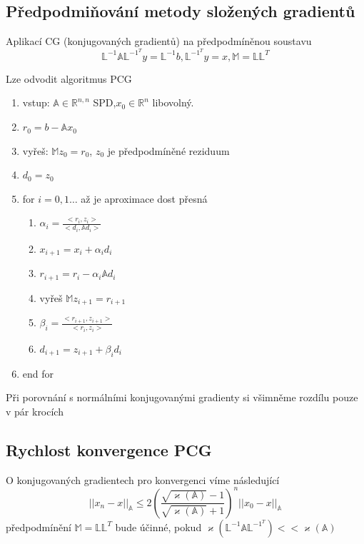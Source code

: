 \documentclass[../main.tex]{subfiles}
\begin{document}
\subsection{Předpodmiňování metody složených gradientů}
Aplikací CG (konjugovaných gradientů) na předpodmíněnou soustavu 
\begin{equation*}
\mathbb{L}^{-1}\mathbb{A}\mathbb{L}^{-1^T} y = \mathbb{L}^{-1}b, \mathbb{L}^{-1^T}y = x, \mathbb{M} = \mathbb{L}\mathbb{L}^T
\end{equation*}

Lze odvodit algoritmus PCG 
\begin{enumerate}
    \item vstup: $\mathbb{A}\in\mathbb{R}^{n,n}$ SPD,$x_0\in\mathbb{R}^n$ libovolný.
    \item $r_0 = b - \mathbb{A}x_0$
    \item vyřeš: $\mathbb{M}z_0 = r_0$, $z_0$ je předpodmíněné reziduum
    \item $d_0 = z_0$
    \item for $i=0,1\dots$ až je aproximace dost přesná \begin{enumerate}
        \item $\alpha_i = \frac{<r_i, z_i>}{<d_i, \mathbb{A}d_i>}$
        \item $x_{i+1} = x_i + \alpha_i d_i$
        \item $r_{i+1} = r_i - \alpha_i \mathbb{A} d_i$
        \item vyřeš $\mathbb{M}z_{i+1} = r_{i+1}$
        \item $\beta_i = \frac{<r_{i+1}, z_{i+1}>}{<r_i, z_i>}$
        \item $d_{i+1} = z_{i+1} + \beta_i d_i$
    \end{enumerate}
    \item end for 
\end{enumerate}

\begin{remark}
    Při porovnání s normálními konjugovanými gradienty si všimněme rozdílu pouze v pár krocích
\end{remark}

\subsection{Rychlost konvergence PCG}

O konjugovaných gradientech pro konvergenci víme následující \begin{equation*}
    ||x_n -x ||_\mathbb{A} \leq 2 \left( \frac{\sqrt{\varkappa(\mathbb{A})}-1}{\sqrt{\varkappa(\mathbb{A})}+1} \right)^n ||x_0 -x||_\mathbb{A}
\end{equation*}
předpodmínění $\mathbb{M} = \mathbb{L} \mathbb{L}^T$ bude účinné, pokud $\varkappa(\mathbb{L}^{-1}\mathbb{A}\mathbb{L}^{-1^T}) << \varkappa(\mathbb{A})$
\end{document}
